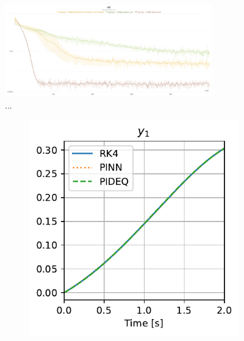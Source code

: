 \begin{figure}[h]
    \centering
    \includegraphics[width=0.8\textwidth]{images/final_iae.png}
    \caption{...}  %
    \label{fig:final-iae}
\end{figure}

\begin{figure}[h]
    \centering
    \begin{subfigure}[t]{.45\textwidth}
	\includegraphics{images/final_vdp_y1.pdf}
	\caption{}
    \end{subfigure}
    \begin{subfigure}[t]{.45\textwidth}

\end{subfigure}
\end{figure}
